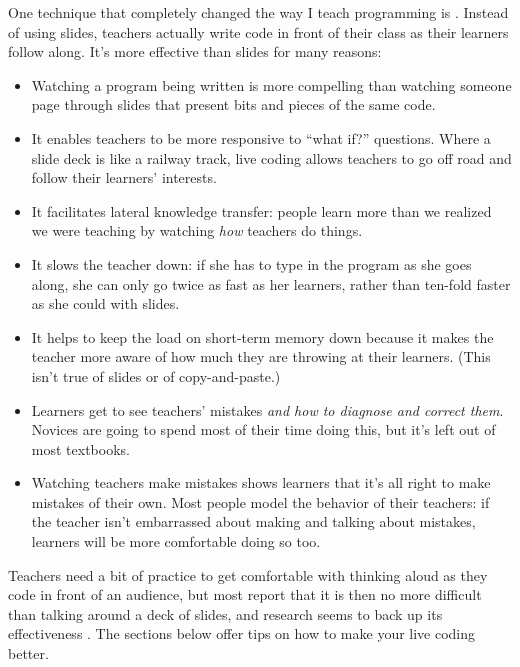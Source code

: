 One technique that completely changed the way I teach programming is
. Instead of using slides,
teachers actually write code in front of their class as their learners
follow along. It's more effective than slides for many reasons:

\begin{itemize}

  \item
    Watching a program being written is more compelling than watching
    someone page through slides that present bits and pieces of the
    same code.

  \item
    It enables teachers to be more responsive to ``what if?''
    questions. Where a slide deck is like a railway track, live coding
    allows teachers to go off road and follow their learners'
    interests.

  \item
    It facilitates lateral knowledge transfer: people learn more than
    we realized we were teaching by watching \emph{how} teachers do
    things.

  \item
    It slows the teacher down: if she has to type in the program as
    she goes along, she can only go twice as fast as her learners,
    rather than ten-fold faster as she could with slides.

  \item
    It helps to keep the load on short-term memory down because it
    makes the teacher more aware of how much they are throwing at
    their learners. (This isn't true of slides or of copy-and-paste.)

  \item
    Learners get to see teachers' mistakes \emph{and how to diagnose
      and correct them}. Novices are going to spend most of their time
    doing this, but it's left out of most textbooks.

  \item
    Watching teachers make mistakes shows learners that it's all right
    to make mistakes of their own. Most people model the behavior of
    their teachers: if the teacher isn't embarrassed about making and
    talking about mistakes, learners will be more comfortable doing so
    too.

\end{itemize}

Teachers need a bit of practice to get comfortable with thinking aloud
as they code in front of an audience, but most report that it is then
no more difficult than talking around a deck of slides, and research
seems to back up its effectiveness \cite{Rubi2013,Haar2017}.  The
sections below offer tips on how to make your live coding better.

